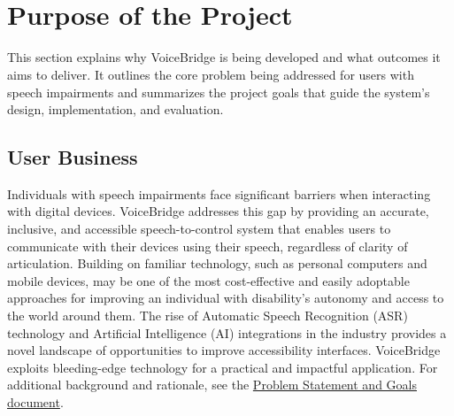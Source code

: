 \documentclass[11pt]{article}
\begin{document}
~\\

~\newpage
{}

\section{Purpose of the Project}
This section explains why VoiceBridge is being developed and what outcomes it aims to deliver. It outlines the core problem being addressed for users with speech impairments and summarizes the project goals that guide the system's design, implementation, and evaluation.

\subsection{User Business}


Individuals with speech impairments face significant barriers when interacting with digital devices. VoiceBridge addresses this gap by providing an accurate, inclusive, and accessible speech-to-control system that enables users to communicate with their devices using their speech, regardless of clarity of articulation. Building on familiar technology, such as personal computers and mobile devices, may be one of the most cost-effective and easily adoptable approaches for improving an individual with disability’s autonomy and access to the world around them. The rise of Automatic Speech Recognition (ASR)  technology and Artificial Intelligence (AI) integrations in the industry provides a novel landscape of opportunities to improve accessibility interfaces. VoiceBridge exploits bleeding-edge technology for a practical and impactful application. For additional background and rationale, see the \href{https://github.com/speech-buddies/VoiceBridge/blob/main/docs/ProblemStatementAndGoals/ProblemStatement.pdf}{Problem Statement and Goals document}.
\end{document}
